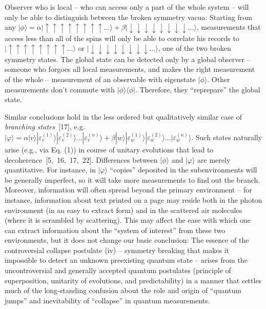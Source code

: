 \documentclass[aps,twocolumn,pra]{revtex4}
\newcommand{\ket}[1]    {| #1 \rangle}
\newcommand{\kb}[2]     {| #1 \rangle \! \langle #2 |}
\newcommand{\+}         {\dagger}
\begin{document}
Observer who is local -- who can access only a part of the whole system -- will only be able 
to distinguish between the broken symmetry vacua: Starting from any $\ket \phi = \alpha \ket{\uparrow \uparrow \uparrow \uparrow \uparrow \uparrow \uparrow \uparrow \dots} + \beta \ket {\downarrow \downarrow \downarrow \downarrow\downarrow \downarrow\downarrow \downarrow \dots} $, measurements that access less than all of the spins will only be able to correlate 
his records to $\ket{\uparrow \uparrow \uparrow \uparrow \uparrow \uparrow \uparrow \uparrow \dots}$
or $ \ket {\downarrow \downarrow \downarrow \downarrow\downarrow \downarrow\downarrow \downarrow \dots} $,
one of the two broken symmetry states.
The global state can be detected only by a global observer -- someone who forgoes all local measurements, and makes the right measurement of the whole -- measurement of an observable with 
eigenstate $\ket \phi$. Other measurements don't commute with $\kb {\phi }{\phi}$. Therefore, they
``reprepare'' the global state.

Similar conclusions hold in the less ordered but qualitatively similar case of {\it branching states}~[17],
e.g. $\ket \varphi = \alpha \ket v \ket {\varepsilon^{(1)}_v} \ket {\varepsilon^{(2)}_v} \dots \ket {\varepsilon^{(n)}_v} + \beta \ket w \ket {\varepsilon^{(1)}_w} \ket {\varepsilon^{(2)}_w} \dots \ket {\varepsilon^{(n)}_w}$. Such states naturally arise (e.g., via Eq. (1)) in course of unitary evolutions that lead to decoherence~[5,~16,~17,~22].  
Differences between $\ket \phi$ and $\ket \varphi$ are merely quantitative. For instance, in $\ket \varphi$ 
``copies'' deposited in the subenvironments will be generally imperfect, so it will take more 
measurements to find out the branch. Moreover, information will often spread beyond the primary 
environment -- for instance, information about text printed on a page may reside both in the photon 
environment (in an easy to extract form) and in the scattered air molecules (where it is scrambled 
by scattering). This may affect the ease with which one can extract information about 
the ``system of interest'' from these two environments, but it does not change our basic conclusion:
The essence of the controversial collapse postulate (iv) -- symmetry breaking that makes it impossible to detect an unknown preexisting quantum state -- arises from the uncontroversial 
and generally accepted quantum postulates (principle of superposition, unitarity of evolutions, and 
predictability) in a manner that settles much of the long-standing confusion about the role and origin of ``quantum jumps'' and inevitability of ``collapse'' in quantum measurements.
 
\end{document}
